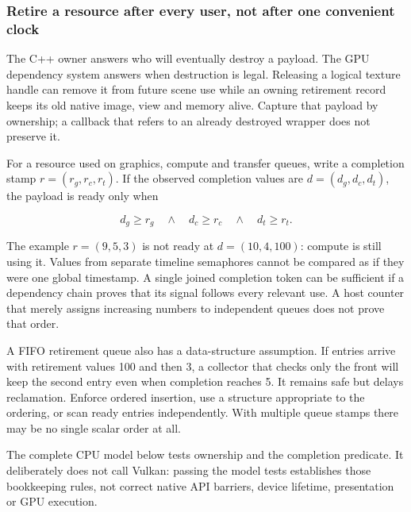 \subsubsection{Retire a resource after every user, not after one convenient clock}\label{retire-a-resource-after-every-user-not-after-one-convenient-clock}

The C++ owner answers who will eventually destroy a payload. The GPU dependency system answers when destruction is legal. Releasing a logical texture handle can remove it from future scene use while an owning retirement record keeps its old native image, view and memory alive. Capture that payload by ownership; a callback that refers to an already destroyed wrapper does not preserve it.

For a resource used on graphics, compute and transfer queues, write a completion stamp \(r=(r_g,r_c,r_t)\). If the observed completion values are \(d=(d_g,d_c,d_t)\), the payload is ready only when

\[
d_g\ge r_g\quad\land\quad d_c\ge r_c\quad\land\quad d_t\ge r_t.
\]

The example \(r=(9,5,3)\) is not ready at \(d=(10,4,100)\): compute is still using it. Values from separate timeline semaphores cannot be compared as if they were one global timestamp. A single joined completion token can be sufficient if a dependency chain proves that its signal follows every relevant use. A host counter that merely assigns increasing numbers to independent queues does not prove that order.

A FIFO retirement queue also has a data-structure assumption. If entries arrive with retirement values 100 and then 3, a collector that checks only the front will keep the second entry even when completion reaches 5. It remains safe but delays reclamation. Enforce ordered insertion, use a structure appropriate to the ordering, or scan ready entries independently. With multiple queue stamps there may be no single scalar order at all.

The complete CPU model below tests ownership and the completion predicate. It deliberately does not call Vulkan: passing the model tests establishes those bookkeeping rules, not correct native API barriers, device lifetime, presentation or GPU execution.

